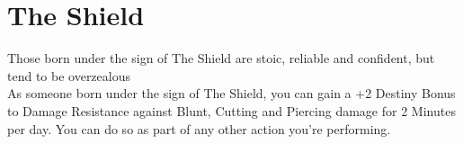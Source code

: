 \section{The Shield}\label{zodiac:shield}

Those born under the sign of The Shield are stoic, reliable and confident, but tend to be overzealous\\
As someone born under the sign of The Shield, you can gain a +2 Destiny Bonus to Damage Resistance against Blunt, Cutting and Piercing damage for 2 Minutes per day.
You can do so as part of any other action you're performing.\\